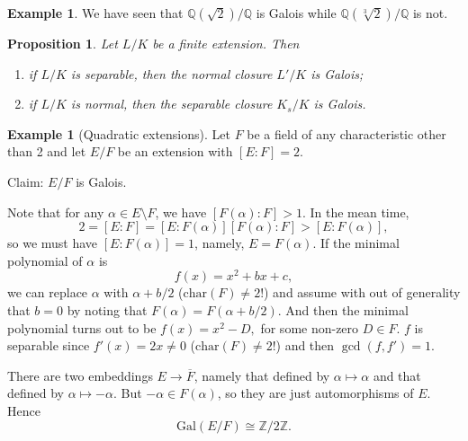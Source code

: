 \documentclass[12pt]{report}
\newtheorem{prop}[thm]{Proposition}
{\theoremstyle{remark}\newtheorem*{remark}{Remark}}
\theoremstyle{definition}
\newtheorem{example}[thm]{Example}
\def\ZZ{\mathbb{Z}}
\def\QQ{\mathbb{Q}}
\def\aa{\alpha}
\def\Gal{\text{Gal}}
\def\char{\text{char}}
\begin{document}
\begin{example}
    We have seen that $\QQ(\sqrt{2})/\QQ$ is Galois while $\QQ(\sqrt[3]{2})/\QQ$ is not.
\end{example}

\begin{prop}
    Let $L/K$ be a finite extension. Then
    \begin{enumerate}
        \item if $L/K$ is separable, then the normal closure $L'/K$ is Galois;
        \item if $L/K$ is normal, then the separable closure $K_s/K$ is Galois.
    \end{enumerate}
\end{prop}

\begin{example}[Quadratic extensions]
    Let $F$ be a field of any characteristic other than 2 and let $E/F$ be an extension with $[E:F]=2$.

    Claim: $E/F$ is Galois.

    Note that for any $\aa\in E\setminus F$, we have $[F(\aa):F] > 1$. In the mean time, $$2 = [E:F]=[E:F(\aa)][F(\aa):F] > [E:F(\aa)],$$ so we must have $[E:F(\aa)]=1$, namely, $E=F(\aa)$. If the minimal polynomial of $\aa$ is $$f(x)=x^2+bx+c,$$ we can replace $\aa$ with $\aa+b/2$ ($\char(F)\not=2$!) and assume with out of generality that $b=0$ by noting that $F(\aa)=F(\aa+b/2)$. And then the minimal polynomial turns out to be $f(x)=x^2-D,$ for some non-zero $D\in F$. $f$ is separable since $f'(x)=2x\not=0$ ($\char(F)\not=2$!) and then $\gcd(f,f')=1$.

    There are two embeddings $E\to \overline{F}$, namely that defined by $\aa\mapsto\aa$ and that defined by $\aa\mapsto -\aa$. But $-\aa\in F(\aa)$, so they are just automorphisms of $E$. Hence $$\Gal(E/F)\cong \ZZ/2\ZZ.$$
\end{example}
\end{document}
